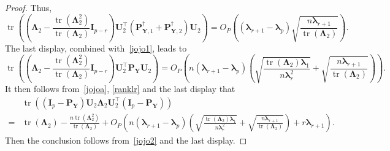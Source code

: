\documentclass[10pt]{book}
\theoremstyle{definition}
\DeclareMathOperator{\mytr}{tr}
\newcommand{\bP}{\mathbf{P}}
\newcommand{\bY}{\mathbf{Y}}
\newcommand{\bI}{\mathbf{I}}
\newcommand{\bU}{\mathbf{U}}
\newcommand{\bfsym}[1]{\ensuremath{\boldsymbol{#1}}}
\def\blambda {\bfsym {\lambda}}
\def\bLambda {\bfsym {\Lambda}}
\begin{document}
\begin{proof}
       Thus,
       \begin{equation*}
        \mytr\left(
            \left(\bLambda_2-\frac{\mytr(\bLambda_2^2)}{\mytr(\bLambda_2)}\bI_{p-r}\right) \bU_2^\top \left(\bP_{\bY,1}^\dagger+\bP_{\bY,2}^\dagger\right) \bU_2 
    \right)
    =O_P\left((\blambda_{r+1}-\blambda_p)\sqrt{\frac{n\blambda_{r+1}}{\mytr(\bLambda_2)}}\right).
       \end{equation*}
       The last display, combined with~\eqref{jojo1}, leads to
\begin{equation*}
        \mytr\left(
            \left(\bLambda_2-\frac{\mytr(\bLambda_2^2)}{\mytr(\bLambda_2)}\bI_{p-r}\right) \bU_2^\top \bP_{\bY} \bU_2 
    \right)
    =
    O_P\left(n(\blambda_{r+1}-\blambda_p)\left(\sqrt{\frac{\mytr(\bLambda_2)\blambda_1}{n\blambda_r^2}}+\sqrt{\frac{n\blambda_{r+1}}{\mytr(\bLambda_2)}}\right)\right).
\end{equation*}
It then follows from~\eqref{jojoa}, \eqref{ranklr} and the last display that
\begin{equation*}
    \begin{split}
        &\mytr\left(
         (\bI_p -\bP_\bY)\bU_2 \bLambda_2 \bU_2^\top (\bI_p- \bP_{\bY})
    \right)
    \\
    =&\mytr(\bLambda_2)-\frac{n\mytr(\bLambda_2^2)}{\mytr(\bLambda_2)}
    +
    O_P\left(n(\blambda_{r+1}-\blambda_p)\left(\sqrt{\frac{\mytr(\bLambda_2)\blambda_1}{n\blambda_r^2}}+\sqrt{\frac{n\blambda_{r+1}}{\mytr(\bLambda_2)}}\right)
    +r\blambda_{r+1}
    \right).
    \end{split}
\end{equation*}
Then the conclusion follows from~\eqref{jojo2} and the last display.
\end{proof}
\end{document}
